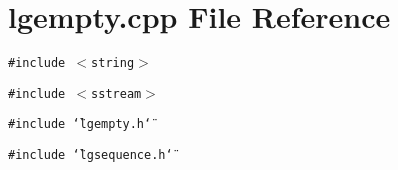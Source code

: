 \section{lgempty.cpp File Reference}
\label{lgempty_8cpp}
{\tt \#include $<$string$>$}\par
{\tt \#include $<$sstream$>$}\par
{\tt \#include \char`\"{}lgempty.h\char`\"{}}\par
{\tt \#include \char`\"{}lgsequence.h\char`\"{}}\par
